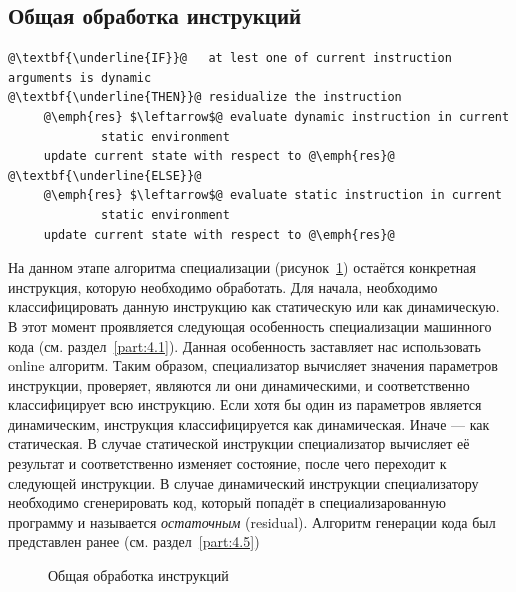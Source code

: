 \subsection{Общая обработка инструкций}
\newsavebox\boxminusone
\begin{lrbox}{\boxminusone}
\begin{lstlisting}[xleftmargin = 20pt]
@\textbf{\underline{IF}}@   at lest one of current instruction arguments is dynamic
@\textbf{\underline{THEN}}@ residualize the instruction
     @\emph{res} $\leftarrow$@ evaluate dynamic instruction in current
             static environment
     update current state with respect to @\emph{res}@
@\textbf{\underline{ELSE}}@
     @\emph{res} $\leftarrow$@ evaluate static instruction in current
             static environment
     update current state with respect to @\emph{res}@
\end{lstlisting}
\end{lrbox}
На данном этапе алгоритма специализации (рисунок~\ref{fig:handle}) остаётся конкретная инструкция, которую необходимо обработать. Для начала, необходимо классифицировать данную инструкцию как статическую или как динамическую.
В этот момент проявляется следующая особенность специализации машинного кода (см. раздел~\ref{part:4.1}).
Данная особенность заставляет нас использовать online алгоритм. Таким образом, специализатор вычисляет значения параметров инструкции, проверяет, являются ли они динамическими, и соответственно классифицирует всю инструкцию. Если хотя бы один из параметров является динамическим, инструкция классифицируется как динамическая. Иначе --- как статическая.
В случае статической инструкции специализатор вычисляет её результат и соответственно изменяет состояние, после чего переходит к следующей инструкции.
В случае динамический инструкции специализатору необходимо сгенерировать код, который попадёт в специализарованную программу и называется
\emph{остаточным} (residual).
Алгоритм генерации кода был представлен ранее (см. раздел~\ref{part:4.5})
\begin{figure}[!t]
\centering
\usebox\boxminusone
\caption{Общая обработка инструкций\label{fig:handle}}
\end{figure}

